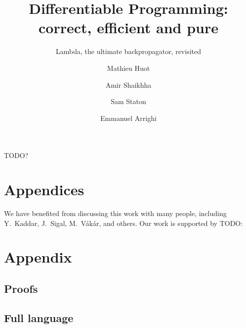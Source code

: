 \documentclass[acmsmall,review,anonymous]{acmart}\settopmatter{printfolios=true,printccs=false,printacmref=false}
\begin{document}
\title{Differentiable Programming: correct, efficient and pure}
\subtitle{Lambda, the ultimate backpropagator, revisited}

\author{Mathieu Huot}

\author{Amir Shaikhha}

\author{Sam Staton}

\author{Emmanuel Arrighi}

\renewcommand{\shortauthors}{Huot, et al.}



\begin{CCSXML}
TODO?
\end{CCSXML}


\maketitle











\section{Appendices}

\begin{acks}
We have benefited from discussing this work with many people, including Y.~Kaddar, J.~Sigal, M.~V\'ak\'ar, and others. 
Our work is supported by TODO:
\end{acks}

\nocite{*}


\appendix
\section{Appendix}

\subsection{Proofs} %
\label{sub:proofs}

\subsection{Full language} %
\label{sub:full_language}
\end{document}
